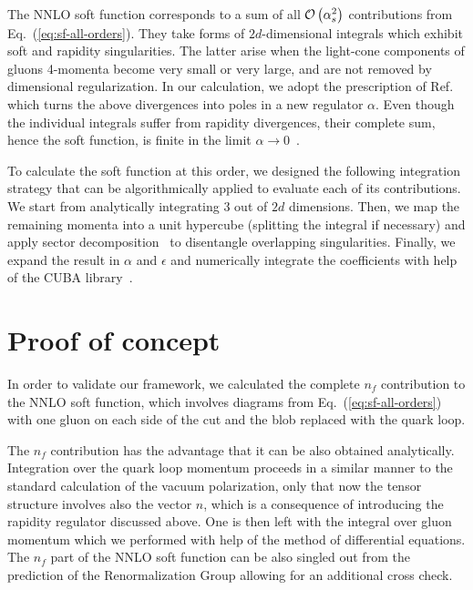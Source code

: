 \documentclass{PoS}
\newcommand{\order}[1]{{{\cal O}\left(#1\right)}}
\begin{document}
The NNLO soft function corresponds to a sum of all $\order{\alpha_s^2}$
contributions from Eq.~(\ref{eq:sf-all-orders}). They take forms of
$2d$-dimensional integrals which exhibit soft and rapidity singularities. The
latter arise when the light-cone components of gluons 4-momenta become very
small or very large, and are not removed by dimensional regularization. In our
calculation, we adopt the prescription of Ref.~\cite{Becher:2011dz} which turns
the above divergences into poles in a new regulator $\alpha$. Even though the
individual integrals suffer from rapidity divergences, their complete sum, hence
the soft function, is finite in the limit $\alpha \to 0$~\cite{Li:2013mia,
Becher:2011dz}.

To calculate the soft function at this order, we designed the following
integration strategy that can be algorithmically applied to evaluate each of its
contributions. We start from analytically integrating 3 out of $2d$ dimensions.
Then, we map the remaining momenta into a unit hypercube (splitting the integral
if necessary) and apply sector decomposition~\cite{Binoth:2000ps,Binoth:2003ak}
to disentangle overlapping singularities. Finally, we expand the result in
$\alpha$ and $\epsilon$ and numerically integrate the coefficients with help of
the CUBA library~\cite{Hahn:2004fe}.


\section{Proof of concept}

In order to validate our framework, we calculated the complete $n_f$
contribution to the NNLO soft function, which involves diagrams from
Eq.~(\ref{eq:sf-all-orders}) with one gluon on each side of the cut and the blob
replaced with the quark loop. 

The $n_f$ contribution has the advantage that it can be also obtained
analytically. Integration over the quark loop momentum proceeds in a similar
manner to the standard calculation of the vacuum polarization, only that now the
tensor structure involves also the vector $n$, which is a consequence of
introducing the rapidity regulator discussed above. One is then left with the
integral over gluon momentum which we performed with help of the method of
differential equations. 
%
The $n_f$ part of the NNLO soft function can be also singled out from the prediction of the Renormalization Group allowing for an additional cross check.
\end{document}
